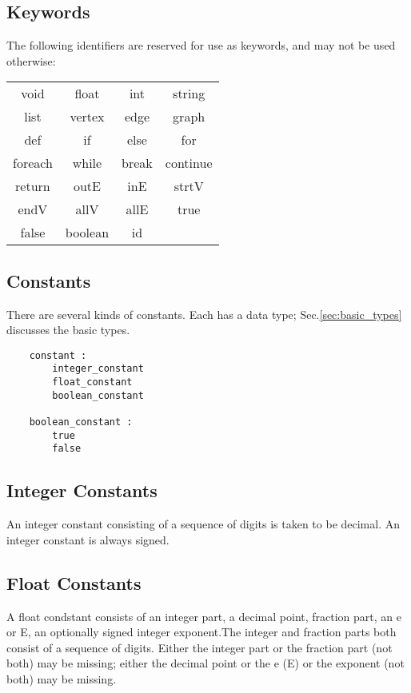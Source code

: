 \documentclass[letterpaper,12pt]{article}
\begin{document}
\subsection{Keywords}
The following identifiers are reserved for use as keywords, and may not be used otherwise:
\begin{table}
\begin{center}
\begin{tabular}{cccc}
        void    &    float   &    int   &      string    \\
        list    &    vertex  &    edge  &      graph     \\
        def     &    if      &    else  &      for       \\
        foreach &    while   &    break &      continue  \\
        return  &    outE    &    inE   &      strtV     \\
        endV    &    allV    &    allE  &      true      \\
        false   &    boolean &    id    &                \\
\end{tabular}
\end{center}
\end{table}

\subsection{Constants}\label{sec:constants}
There are several kinds of constants. Each has a data type; Sec.\ref{sec:basic_types}  discusses the basic types.
\begin{lstlisting}
	constant :
		integer_constant
		float_constant
		boolean_constant

	boolean_constant :
		true
		false
\end{lstlisting}

\subsection{Integer Constants}
An integer constant consisting of a sequence of digits is taken to be decimal. An integer constant is always signed.

\subsection{Float Constants}
A float condstant consists of an integer part, a decimal point, fraction part, an e or E, an optionally signed integer exponent.The integer and fraction parts both consist of a sequence of digits. Either the integer part or the fraction part (not both) may be missing; either the decimal point or the e (E) or the exponent (not both) may be missing.
\end{document}
